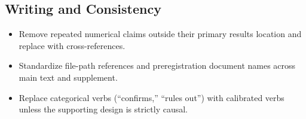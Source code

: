\documentclass[11pt]{article}
\begin{document}
\subsection*{Writing and Consistency}
\begin{itemize}
  \item Remove repeated numerical claims outside their primary results location and replace with cross-references.
  \item Standardize file-path references and preregistration document names across main text and supplement.
  \item Replace categorical verbs (``confirms,'' ``rules out'') with calibrated verbs unless the supporting design is strictly causal.
\end{itemize}
\end{document}
